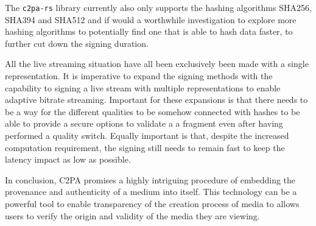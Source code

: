 The \texttt{c2pa-rs} library currently also only supports the hashing algorithms SHA256, SHA394 and SHA512 and if would a worthwhile investigation to explore more hashing algorithms to potentially find one that is able to hash data faster, to further cut down the signing duration.

All the live streaming situation have all been exclusively been made with a single representation. It is imperative to expand the signing methods with the capability to signing a live stream with multiple representations to enable adaptive bitrate streaming. Important for these expansions is that there needs to be a way for the different qualities to be somehow connected with hashes to be able to provide a secure options to validate a a fragment even after having performed a quality switch. Equally important is that, despite the increased computation requirement, the signing still needs to remain fast to keep the latency impact as low as possible.

In conclusion, C2PA promises a highly intriguing procedure of embedding the provenance and authenticity of a medium into itself. This technology can be a powerful tool to enable transparency of the creation process of media to allows users to verify the origin and validity of the media they are viewing.